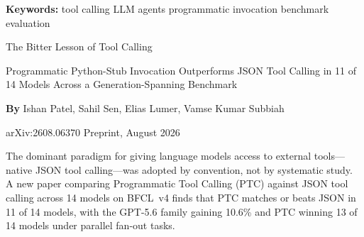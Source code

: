 \documentclass[10pt,twocolumn]{article}
\begin{document}
\setlength{\parindent}{0pt}
\setlength{\parskip}{4pt}

{\small\color{keywordgray}\textbf{Keywords:}
  tool calling \textbullet{}
  LLM agents \textbullet{}
  programmatic invocation \textbullet{}
  benchmark evaluation}\par\vspace{4pt}

{\LARGE\bfseries\raggedright
  The Bitter Lesson of Tool Calling}\par\vspace{4pt}

{\large\itshape\raggedright
  Programmatic Python-Stub Invocation Outperforms JSON Tool Calling
  in 11 of 14 Models Across a Generation-Spanning Benchmark}\par\vspace{6pt}

{\small\textbf{By} Ishan Patel, Sahil Sen, Elias Lumer, Vamse Kumar Subbiah}\par\vspace{2pt}

{\small\color{keywordgray}arXiv:2608.06370 \textbullet{} Preprint, August 2026}
\par\vspace{2pt}\noindent{\color{rulered}\rule{\columnwidth}{0.6pt}}\vspace{6pt}

The dominant paradigm for giving language models access to external tools---native JSON
tool calling---was adopted by convention, not by systematic study. A new paper
comparing Programmatic Tool Calling (PTC) against JSON tool calling across 14 models on
BFCL~v4 finds that PTC matches or beats JSON in 11 of 14 models, with the GPT-5.6
family gaining 10.6\% and PTC winning 13 of 14 models under parallel fan-out tasks.
\end{document}
